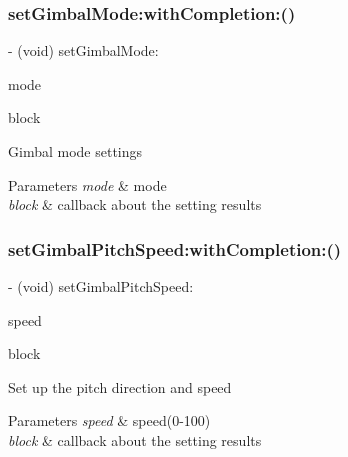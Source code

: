 \subsubsection{\texorpdfstring{set\+Gimbal\+Mode\+:with\+Completion\+:()}{setGimbalMode:withCompletion:()}}
{\footnotesize\ttfamily -\/ (void) set\+Gimbal\+Mode\+: \begin{DoxyParamCaption}\item[{(P\+V\+Gimbal\+Mode)}]{mode }\item[{withCompletion:(P\+V\+Completion\+Block)}]{block }\end{DoxyParamCaption}}

Gimbal mode settings


\begin{DoxyParams}{Parameters}
{\em mode} & mode \\
\hline
{\em block} & callback about the setting results \\
\hline
\end{DoxyParams}
\mbox{\label{interface_p_v_gimabal_a03d3aac39d87e50384c388f1dc28c012}} 
\subsubsection{\texorpdfstring{set\+Gimbal\+Pitch\+Speed\+:with\+Completion\+:()}{setGimbalPitchSpeed:withCompletion:()}}
{\footnotesize\ttfamily -\/ (void) set\+Gimbal\+Pitch\+Speed\+: \begin{DoxyParamCaption}\item[{(int)}]{speed }\item[{withCompletion:(P\+V\+Completion\+Block)}]{block }\end{DoxyParamCaption}}

Set up the pitch direction and speed


\begin{DoxyParams}{Parameters}
{\em speed} & speed(0-\/100) \\
\hline
{\em block} & callback about the setting results \\
\hline
\end{DoxyParams}
\mbox{\label{interface_p_v_gimabal_aaaad76567d8ba219e2810ac929d1730b}} 
